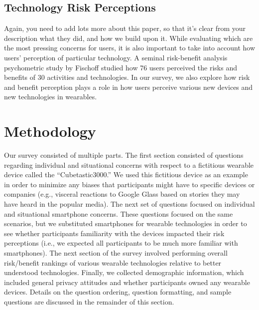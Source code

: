\documentclass{acm_proc_article-sp}
\begin{document}
\subsection{Technology Risk Perceptions}
{\color{red} Again, you need to add lots more about this paper, so that it's clear from your description what they did, and how we build upon it.}
While evaluating which are the most pressing concerns for users, it is also important to take into account how users' perception of particular technology. A seminal risk-benefit analysis psychometric study by Fischoff \cite{Fischhoff} studied how 76 users perceived the risks and benefits of 30 activities and technologies. In our survey, we also explore how risk and benefit perception plays a role in how users perceive various new devices and new technologies in wearables. 


\section{Methodology}
Our survey consisted of multiple parts. The first section consisted of questions regarding individual and situational concerns with respect to a fictitious wearable device called the ``Cubetastic3000.'' We used this fictitious device as an example in order to minimize any biases that participants might have to specific devices or companies (e.g., visceral reactions to Google Glass based on stories they may have heard in the popular media). The next set of questions focused on individual and situational smartphone concerns. These questions focused on the same scenarios, but we substituted smartphones for wearable technologies in order to see whether participants familiarity with the devices impacted their risk perceptions (i.e., we expected all participants to be much more familiar with smartphones). The next section of the survey involved performing overall risk/benefit rankings of various wearable technologies relative to better understood technologies. Finally, we collected demographic information, which included general privacy attitudes and whether participants owned any wearable devices. Details on the question ordering, question formatting, and sample questions are discussed in the remainder of this section. 


\end{document}
